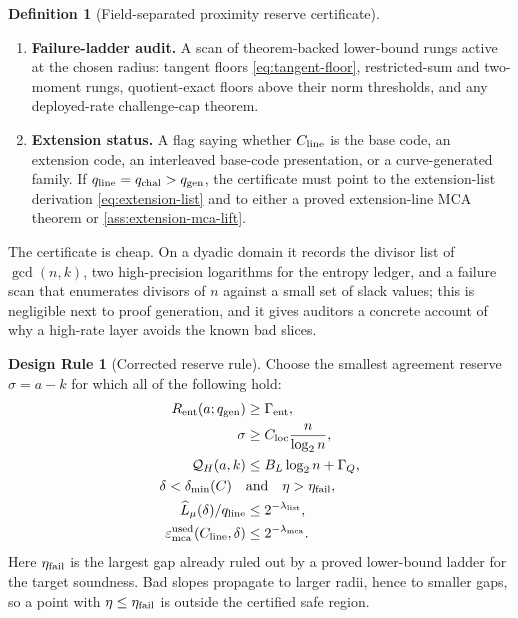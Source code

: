 \documentclass[11pt]{article}
\theoremstyle{definition}
\newtheorem{definition}[theorem]{Definition}
\newtheorem{designrule}[theorem]{Design Rule}
\newcommand{\Hbin}{\operatorname{H}_2}
\newcommand{\mca}{\varepsilon_{\rm mca}}
\newcommand{\Qprof}{\mathcal Q}
\newcommand{\qgen}{q_{\rm gen}}
\newcommand{\qchal}{q_{\rm chal}}
\newcommand{\qline}{q_{\rm line}}
\newcommand{\entres}{R_{\rm ent}}
\newcommand{\Int}[2]{#1^{\equiv #2}}
\begin{document}
\begin{definition}[Field-separated proximity reserve certificate]
\begin{enumerate}[label=(\alph*),leftmargin=2.2em]
\begin{equation}
\label{eq:mca-budget}
        \frac{\nu\left(n^{A_M}
        +2^{(\beta(\rho)/\Hbin(\rho))\Qprof_H(a,k)+\Gamma_M}\right)}{\qline}
        \le 2^{-\lambda_{\rm mca}},
\end{equation}
where the factor $\nu$ comes from \eqref{eq:interleaved-mca} and may be replaced by a sharper theorem for $\mca(\Int{C}{\nu},\delta)$, or removed below the unique-decoding radius \cite{DG24}.
\item \textbf{Failure-ladder audit.}  A scan of theorem-backed lower-bound rungs active at the chosen radius: tangent floors \eqref{eq:tangent-floor}, restricted-sum and two-moment rungs, quotient-exact floors above their norm thresholds, and any deployed-rate challenge-cap theorem.
\item \textbf{Extension status.}  A flag saying whether $C_{\rm line}$ is the base code, an extension code, an interleaved base-code presentation, or a curve-generated family.  If $\qline=\qchal>\qgen$, the certificate must point to the extension-list derivation \eqref{eq:extension-list} and to either a proved extension-line MCA theorem or \cref{ass:extension-mca-lift}.
\end{enumerate}
\end{definition}

The certificate is cheap.  On a dyadic domain it records the divisor list of $\gcd(n,k)$, two high-precision logarithms for the entropy ledger, and a failure scan that enumerates divisors of $n$ against a small set of slack values; this is negligible next to proof generation, and it gives auditors a concrete account of why a high-rate layer avoids the known bad slices.

\begin{designrule}[Corrected reserve rule]
\label{rule:reserve}
Choose the smallest agreement reserve $\sigma=a-k$ for which all of the following hold:
\begin{align}
        \entres(a;\qgen)&\ge \Gamma_{\rm ent},
        \label{eq:reserve-ent}\\
        \sigma&\ge C_{\rm loc}\frac n{\log_2 n},
        \label{eq:reserve-local}\\
        \Qprof_H(a,k)&\le B_L\log_2 n+\Gamma_Q,
        \label{eq:reserve-q}\\
        \delta<\delta_{\min}(C) \quad&\text{and}\quad \eta>\eta_{\rm fail},
        \label{eq:reserve-fail}\\
        \widehat L_{\mu}(\delta)/\qline&\le2^{-\lambda_{\rm list}},
        \label{eq:reserve-list}\\
        \varepsilon_{\rm mca}^{\rm used}(C_{\rm line},\delta)&\le2^{-\lambda_{\rm mca}} .
        \label{eq:reserve-mca}
\end{align}
Here $\eta_{\rm fail}$ is the largest gap already ruled out by a proved lower-bound ladder for the target soundness.  Bad slopes propagate to larger radii, hence to smaller gaps, so a point with $\eta\le\eta_{\rm fail}$ is outside the certified safe region.
\end{designrule}
\end{document}

